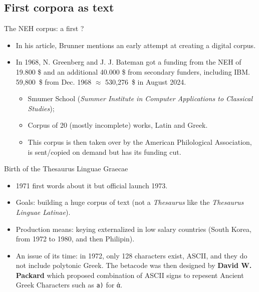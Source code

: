 \documentclass[aspectratio=169]{beamer}
\begin{document}
\subsection{First corpora as text}

\begin{frame}{The NEH corpus: a first ?}

\begin{itemize}
    \item In his article, Brunner  mentions an early attempt at creating a digital corpus.
    \item In 1968, N. Greenberg and J. J. Bateman got a funding from the NEH of 19.800 \$ and an additional 40.000 \$ from secondary funders, including IBM. 59,800~\$ from Dec. 1968 $\approx$ 530,276~\$ in August 2024.
    \begin{itemize}
        \item Smumer School (\textit{Summer Institute in Computer Applications to Classical Studies});
        \item Corpus of 20 (mostly incomplete) works, Latin and Greek.
        \item This corpus is then taken over by the American Philological Association, is sent/copied on demand but has its funding cut.
    \end{itemize}
\end{itemize}
    
\end{frame}

\begin{frame}{Birth of the Thesaurus Linguae Graecae}
    \begin{itemize}
        \item 1971 first words about it \parencite{brunner_classics_1993} but official launch 1973.
        \item Goals: building a huge corpus of text (not a \textit{Thesaurus} like the \textit{Thesaurus Linguae Latinae}).
        \item Production means: keying externalized in low salary countries (South Korea, from 1972 to 1980, and then Philipin).
        \item An issue of its time: in 1972, only 128 characters exist, ASCII, and they do not include polytonic Greek. The betacode was then designed by \textbf{David W. Packard} which proposed combination of ASCII signs to repesent Ancient Greek Characters such as \texttt{a)} for ἀ. 
    \end{itemize}
\end{frame}
\end{document}
